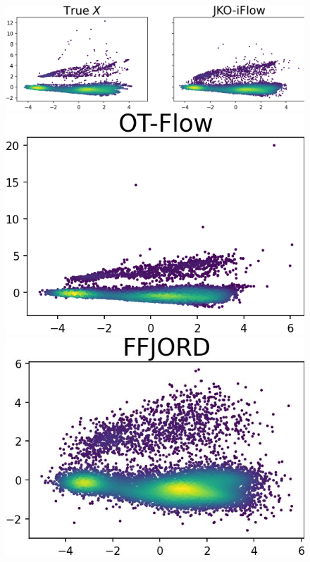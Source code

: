 \documentclass{article}
\theoremstyle{remark}
\theoremstyle{plain}
\begin{document}
{\begin{figure}[!t]
    \begin{minipage}{0.34\textwidth}
        \includegraphics[width=\linewidth]{gas_PCA_2D_compare.png}
    \end{minipage}
    \begin{minipage}{0.155\textwidth}
        \vspace{-0.2in}\includegraphics[width=\linewidth]{gas_PCA_2D_compare_OTFlow.png}
    \end{minipage}
    \begin{minipage}{0.16\textwidth}
        \vspace{-0.2in}\includegraphics[width=\linewidth]{gas_PCA_2D_compare_FFJORD.png}

\end{minipage}
\end{figure}}
\end{document}
